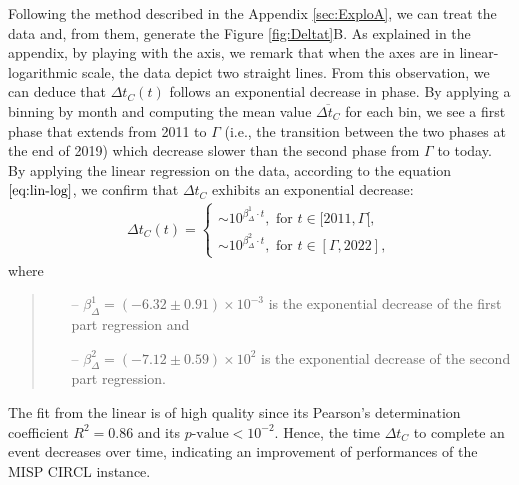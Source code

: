 \documentclass[unnumsec,webpdf,contemporary,large]{oup-authoring-template}%
\theoremstyle{thmstyleone}%
\theoremstyle{thmstyletwo}%
\theoremstyle{thmstylethree}%
\begin{document}
Following the method described in the Appendix \ref{sec:ExploA}, we can treat the data and, from them, generate the Figure \ref{fig:Deltat}B. As explained in the appendix, by playing with the axis, we remark that when the axes are in linear-logarithmic scale, the data depict two straight lines. From this observation, we can deduce that $\Delta t_C(t)$ follows an exponential decrease in phase. By applying a binning by month and computing the mean value $\overline{\Delta t_C}$ for each bin, we see a first phase that extends from 2011 to $\Gamma$ (i.e., the transition between the two phases at the end of 2019) which decrease slower than the second phase from $\Gamma$ to today. By applying the linear regression on the data, according to the equation $\eqref{eq:lin-log}$, we confirm that $\Delta t_C$ exhibits an exponential decrease:
    \begin{align}
        \Delta t_C(t) =
        \begin{cases}
        \sim 10^{\beta_{\Delta}^1 \cdot t}, \textrm{ for } t \in [2011,\Gamma[, \\
        \sim 10^{\beta_{\Delta}^2 \cdot t}, \textrm{ for } t \in [\Gamma,2022],
        \end{cases}
    \end{align}
    \noindent
    where
    \begin{quote}
        \begin{itemize}
            \item[--] $\beta_{\Delta}^1 = (- 6.32 \pm 0.91) \times 10^{-3}$ is the exponential decrease of the first part regression and
            \item[--] $\beta_{\Delta}^2 = (-7.12 \pm 0.59) \times 10^{2}$ is the exponential decrease of the second part regression.
        \end{itemize}
    \end{quote}

The fit from the linear is of high quality since its Pearson's determination coefficient $R^2 =0.86$ and its $p\textrm{-value}< 10^{-2}$.
Hence, the time $\Delta t_C$ to complete an event decreases over time, indicating an improvement of performances of the MISP CIRCL instance.
\end{document}
